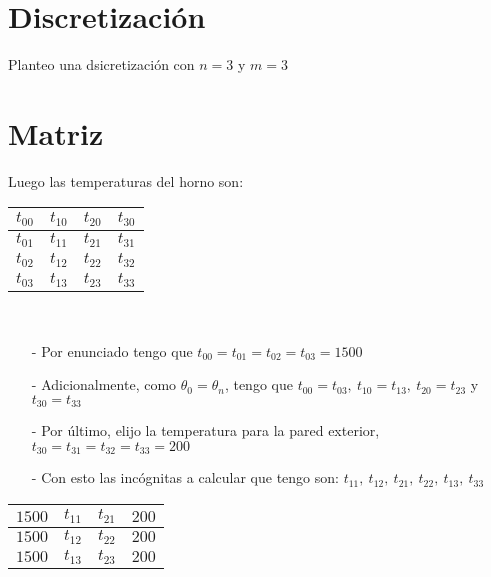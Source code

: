 \documentclass{article}
\title{}
\author{}
\date{}
\begin{document}
\section*{Discretización}
Planteo una dsicretización con  $n = 3$ y $m = 3$

\section*{Matriz}

Luego las temperaturas del horno son:

\begin{center}
    \begin{tabular}{|c|c|c|c|}
        \hline
        $t_{00}$ & $t_{10}$ & $t_{20}$ & $t_{30}$ \\
        \hline
        $t_{01}$ & $t_{11}$ & $t_{21}$ & $t_{31}$ \\
        \hline
        $t_{02}$ & $t_{12}$ & $t_{22}$ & $t_{32}$ \\
        \hline
        $t_{03}$ & $t_{13}$ & $t_{23}$ & $t_{33}$ \\
        \hline
    \end{tabular}
\end{center}

\

\begin{itemize}
    \item[-] Por enunciado tengo que $t_{00} = t_{01} = t_{02} = t_{03} = 1500$
    \item[-] Adicionalmente, como $\theta_0 = \theta_{n}$, tengo que $t_{00} = t_{03},~t_{10} = t_{13},~t_{20} = t_{23}$ y 
          $t_{30} = t_{33}$
    \item[-] Por último, elijo la temperatura para la pared exterior, $t_{30} = t_{31} = t_{32} = t_{33} = 200$
    \item[-] Con esto las incógnitas a calcular que tengo son: $t_{11},~t_{12},~t_{21},~t_{22},~t_{13},~t_{33}$
\end{itemize}

\begin{center}
    \begin{tabular}{|c|c|c|c|}
        \hline
        $1500$ & $t_{11}$ & $t_{21}$ & $200$ \\
        \hline
        $1500$ & $t_{12}$ & $t_{22}$ & $200$ \\
        \hline
        $1500$ & $t_{13}$ & $t_{23}$ & $200$ \\
        \hline
    \end{tabular}
\end{center}
\end{document}

